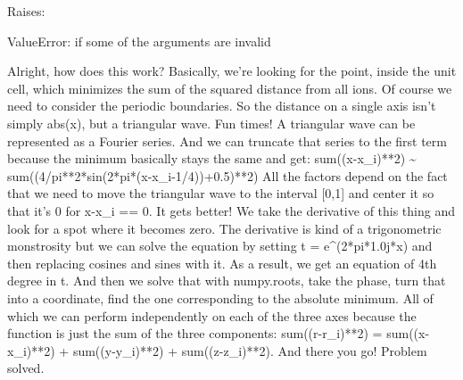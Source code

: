 \documentclass[letterpaper,10pt,english]{sphinxmanual}
\begin{document}
\begin{fulllineitems}
\begin{DUlineblock}{0em}
\item[] Raises:
\item[]
\begin{DUlineblock}{\DUlineblockindent}
\item[] ValueError: if some of the arguments are invalid
\end{DUlineblock}
\end{DUlineblock}

\end{fulllineitems}


\begin{fulllineitems}
\label{doctree/soprano.utils:soprano.utils.periodic_center}
Alright, how does this work?
Basically, we're looking for the point, inside the unit cell, which
minimizes the sum of the squared distance from all ions.
Of course we need to consider the periodic boundaries. So the distance
on a single axis isn't simply abs(x), but a triangular wave.
Fun times! A triangular wave can be represented as a Fourier series. And
we can truncate that series to the first term because the minimum
basically stays the same and get:
sum((x-x\_i)**2) \textasciitilde{} sum((4/pi**2*sin(2*pi*(x-x\_i-1/4))+0.5)**2)
All the factors depend on the fact that we need to move the triangular
wave to the interval {[}0,1{]} and center it so that it's 0 for x-x\_i == 0.
It gets better! We take the derivative of this thing and look for a spot
where it becomes zero. The derivative is kind of a trigonometric
monstrosity but we can solve the equation by setting t = e\textasciicircum{}(2*pi*1.0j*x)
and then replacing cosines and sines with it. As a result, we get an
equation of 4th degree in t. And then we solve that with numpy.roots, take
the phase, turn that into a coordinate, find the one corresponding to the
absolute minimum.
All of which we can perform independently on each of the three axes
because the function is just the sum of the three components:
sum((r-r\_i)**2) = sum((x-x\_i)**2) + sum((y-y\_i)**2) + sum((z-z\_i)**2).
And there you go! Problem solved.

\end{fulllineitems}

\end{document}
